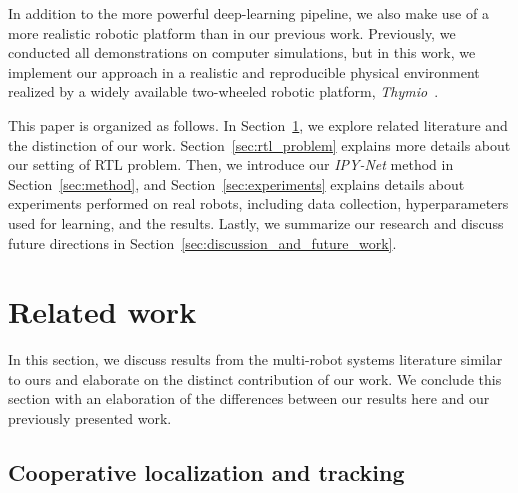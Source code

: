 \documentclass[letterpaper, 10 pt, conference]{ieeeconf}  %
\begin{document}
    In addition to the more powerful deep-learning pipeline, we also
    make use of a more realistic robotic platform than in our previous
    work. Previously, we conducted all demonstrations on computer
    simulations, but in this work, we implement our approach in a
    realistic and reproducible physical environment realized by a widely
    available two-wheeled robotic platform, \emph{Thymio}~\cite{Shin14}.


    This paper is organized as follows. In
    Section~\ref{sec:related_work}, we explore related literature and
    the distinction of our work. Section~\ref{sec:rtl_problem} explains
    more details about our setting of RTL problem. Then, we introduce
    our \emph{IPY-Net} method in Section~\ref{sec:method}, and
    Section~\ref{sec:experiments} explains details about experiments
    performed on real robots, including data collection, hyperparameters
    used for learning, and the results. Lastly, we summarize our
    research and discuss future directions in
    Section~\ref{sec:discussion_and_future_work}.

	\section{Related work}
	\label{sec:related_work}

    In this section, we discuss results from the multi-robot
    systems literature similar to ours and elaborate on the distinct
    contribution of our work. We conclude this section with an
    elaboration of the differences between our results here and our
    previously presented work.

    \subsection{Cooperative localization and tracking}
\end{document}
